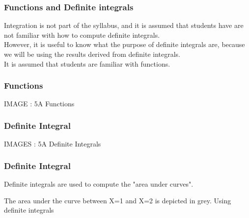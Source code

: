 

\begin{frame}
\frametitle{Functions and Definite integrals}
\large
Integration is not part of the syllabus, and it is assumed that students have are not familiar with how to compute definite integrals.\\ \bigskip
 However,  it is useful to know what the purpose of definite integrals are, because we will be using the results derived from definite integrals. \\ It is assumed that students are familiar with functions.

\end{frame}
\begin{frame}
\frametitle{Functions}

IMAGE : 5A Functions

\end{frame}
\begin{frame}
\frametitle{Definite Integral}

IMAGES : 5A Definite Integrals

\end{frame}
\begin{frame}
\frametitle{Definite Integral}

Definite integrals are used to compute the "area under curves". 

The area under the curve between X=1 and  X=2 is depicted in grey. Using definite integrals

\end{frame}


